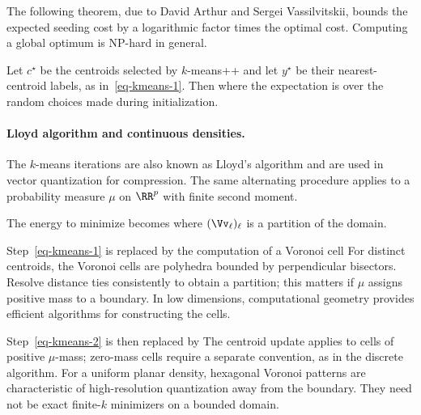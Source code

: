 The following theorem, due to David Arthur and Sergei Vassilvitskii, bounds the expected seeding cost by a logarithmic factor times the optimal cost. Computing a global optimum is NP-hard in general.

\begin{thm}
	Let $c^\star$ be the centroids selected by $k$-means++ and let $y^\star$ be their nearest-centroid labels, as in~\eqref{eq-kmeans-1}. Then
	where the expectation is over the random choices made during initialization.
\end{thm}




    
\paragraph{Lloyd algorithm and continuous densities.}

The $k$-means iterations are also known as Lloyd's algorithm and are used in vector quantization for compression. The same alternating procedure applies to a probability measure $\mu$ on $\RR^p$ with finite second moment.
 
The energy to minimize becomes
where $(\Vv_\ell)_\ell$ is a partition of the domain. 
 
Step~\eqref{eq-kmeans-1} is replaced by the computation of a Voronoi cell
For distinct centroids, the Voronoi cells are polyhedra bounded by perpendicular bisectors. Resolve distance ties consistently to obtain a partition; this matters if $\mu$ assigns positive mass to a boundary. In low dimensions, computational geometry provides efficient algorithms for constructing the cells.
 
Step~\eqref{eq-kmeans-2} is then replaced by
The centroid update applies to cells of positive $\mu$-mass; zero-mass cells require a separate convention, as in the discrete algorithm. For a uniform planar density, hexagonal Voronoi patterns are characteristic of high-resolution quantization away from the boundary. They need not be exact finite-$k$ minimizers on a bounded domain.
 
